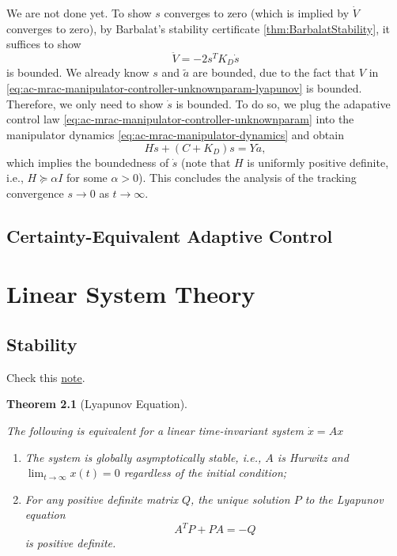 \documentclass[
]{book}
\newtheorem{theorem}{Theorem}[chapter]
\theoremstyle{definition}
\theoremstyle{definition}
\theoremstyle{definition}
\theoremstyle{definition}
\theoremstyle{remark}
\begin{document}
We are not done yet. To show \(s\) converges to zero (which is implied by \(\dot{V}\) converges to zero), by Barbalat's stability certificate \ref{thm:BarbalatStability}, it suffices to show
\[
\ddot{V} = -2 s^T K_D \dot{s}
\]
is bounded. We already know \(s\) and \(\tilde{a}\) are bounded, due to the fact that \(V\) in \eqref{eq:ac-mrac-manipulator-controller-unknownparam-lyapunov} is bounded. Therefore, we only need to show \(\dot{s}\) is bounded. To do so, we plug the adapative control law \eqref{eq:ac-mrac-manipulator-controller-unknownparam} into the manipulator dynamics \eqref{eq:ac-mrac-manipulator-dynamics} and obtain
\[
H \dot{s} + (C + K_D) s = Y\tilde{a},
\]
which implies the boundedness of \(\dot{s}\) (note that \(H\) is uniformly positive definite, i.e., \(H \succeq \alpha I\) for some \(\alpha > 0\)). This concludes the analysis of the tracking convergence \(s \rightarrow 0\) as \(t \rightarrow \infty\).

\hypertarget{certainty-equivalent-adaptive-control}{%
\section{Certainty-Equivalent Adaptive Control}\label{certainty-equivalent-adaptive-control}}

\hypertarget{appendix-appendix}{%
\appendix}


\hypertarget{linear-system-theory}{%
\chapter{Linear System Theory}\label{linear-system-theory}}

\hypertarget{app-lti-stability}{%
\section{Stability}\label{app-lti-stability}}

Check this \href{https://intra.engr.ucr.edu/~enozari/teaching/ME120_Fall20/Lecture\%203\%20-\%20Stability,\%20Controllability\%20\&\%20Observability.pdf}{note}.

\begin{theorem}[Lyapunov Equation]
\protect\hypertarget{thm:lyapunovequation}{}\label{thm:lyapunovequation}

The following is equivalent for a linear time-invariant system \(\dot{x} = A x\)

\begin{enumerate}
\def\labelenumi{\arabic{enumi}.}
\item
  The system is globally asymptotically stable, i.e., \(A\) is Hurwitz and \(\lim_{t \rightarrow \infty} x(t) = 0\) regardless of the initial condition;
\item
  For any positive definite matrix \(Q\), the unique solution \(P\) to the Lyapunov equation
  \begin{equation}
  A^T P + P A = -Q
  \label{eq:lyapunov-equation}
  \end{equation}
  is positive definite.
\end{enumerate}

\end{theorem}
\end{document}
